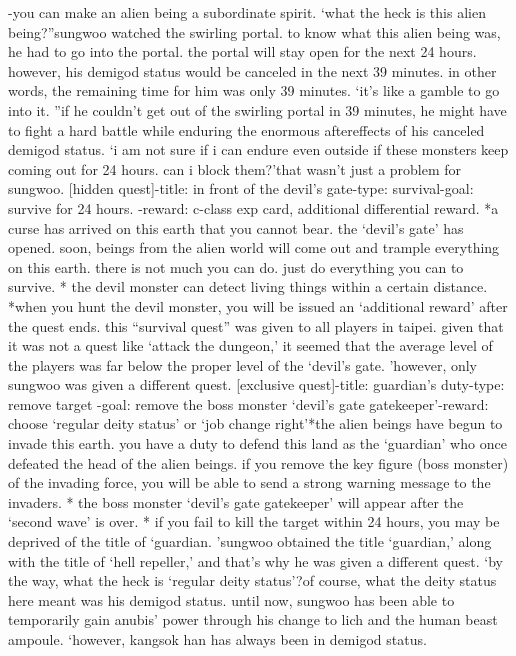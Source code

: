 -you can make an alien being a subordinate spirit.
‘what the heck is this alien being?”sungwoo watched the swirling portal.
 to know what this alien being was, he had to go into the portal.
the portal will stay open for the next 24 hours.
 however, his demigod status would be canceled in the next 39 minutes.
 in other words, the remaining time for him was only 39 minutes.
‘it’s like a gamble to go into it.
”if he couldn’t get out of the swirling portal in 39 minutes, he might have to fight a hard battle while enduring the enormous aftereffects of his canceled demigod status.
‘i am not sure if i can endure even outside if these monsters keep coming out for 24 hours.
 can i block them?’that wasn’t just a problem for sungwoo.
[hidden quest]-title: in front of the devil’s gate-type: survival-goal: survive for 24 hours.
-reward: c-class exp card, additional differential reward.
*a curse has arrived on this earth that you cannot bear.
 the ‘devil’s gate’ has opened.
 soon, beings from the alien world will come out and trample everything on this earth.
there is not much you can do.
 just do everything you can to survive.
* the devil monster can detect living things within a certain distance.
*when you hunt the devil monster, you will be issued an ‘additional reward’ after the quest ends.
this “survival quest” was given to all players in taipei.
 given that it was not a quest like ‘attack the dungeon,’ it seemed that the average level of the players was far below the proper level of the ‘devil’s gate.
’however, only sungwoo was given a different quest.
[exclusive quest]-title: guardian’s duty-type: remove target
-goal: remove the boss monster ‘devil’s gate gatekeeper’-reward: choose ‘regular deity status’ or ‘job change right’*the alien beings have begun to invade this earth.
 you have a duty to defend this land as the ‘guardian’ who once defeated the head of the alien beings.
 if you remove the key figure (boss monster) of the invading force, you will be able to send a strong warning message to the invaders.
* the boss monster ‘devil’s gate gatekeeper’ will appear after the ‘second wave’ is over.
* if you fail to kill the target within 24 hours, you may be deprived of the title of ‘guardian.
’sungwoo obtained the title ‘guardian,’ along with the title of ‘hell repeller,’ and that’s why he was given a different quest.
‘by the way, what the heck is ‘regular deity status’?of course, what the deity status here meant was his demigod status.
 until now, sungwoo has been able to temporarily gain anubis’ power through his change to lich and the human beast ampoule.
‘however, kangsok han has always been in demigod status.

